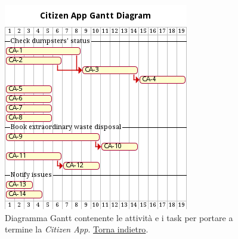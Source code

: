 \begin{figure}[H]
    \centering
    \includegraphics[width=\textwidth]{img/gantt-citizen-app.pm}
    \caption{Diagramma Gantt contenente le attività e i task per portare a termine la \textit{Citizen App}. \hyperlink{back:gantt-citizen-app}{Torna indietro}.}
    \label{fig:gantt-citizen-app}
\end{figure}
